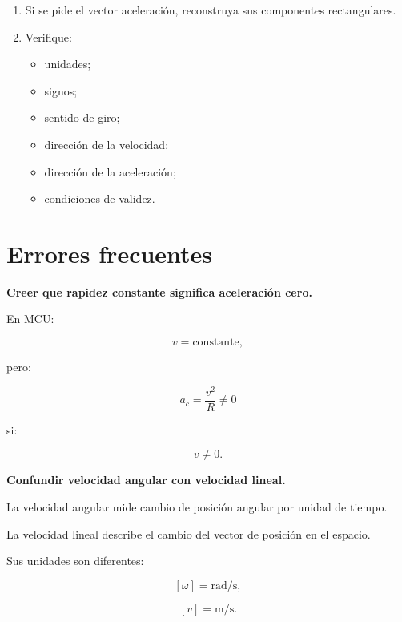 \begin{estrategia}
\begin{enumerate}
    \item Si se pide el vector aceleración, reconstruya sus componentes
    rectangulares.

    \item Verifique:
    \begin{itemize}
        \item unidades;
        \item signos;
        \item sentido de giro;
        \item dirección de la velocidad;
        \item dirección de la aceleración;
        \item condiciones de validez.
    \end{itemize}

\end{enumerate}

\end{estrategia}


\section{Errores frecuentes}

\begin{errorfrecuente}

\textbf{Creer que rapidez constante significa aceleración cero.}

En MCU:

\[
v=\text{constante},
\]

pero:

\[
a_c=\frac{v^2}{R}\neq0
\]

si:

\[
v\neq0.
\]

\end{errorfrecuente}


\begin{errorfrecuente}

\textbf{Confundir velocidad angular con velocidad lineal.}

La velocidad angular mide cambio de posición angular por unidad de tiempo.

La velocidad lineal describe el cambio del vector de posición en el espacio.

Sus unidades son diferentes:

\[
[\omega]=\si{\radian\per\second},
\]

\[
[v]=\si{\meter\per\second}.
\]

\end{errorfrecuente}


